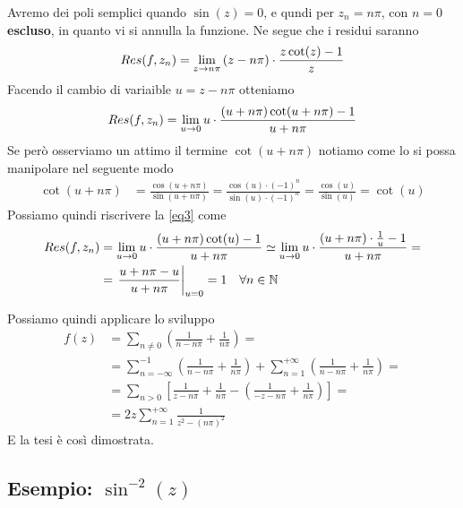 Avremo dei poli semplici quando $\sin(z) = 0$, e qundi per $z_n=n\pi$, con $n=0$ \textbf{escluso}, in quanto vi si annulla la funzione. Ne segue che i residui saranno
\begin{align}
	Res(f,z_n) = \underset{z \rightarrow n\pi}{\lim} \,  (z-n\pi) \cdot \frac{z\cot(z) -1}{z}
\end{align} 
Facendo il cambio di variaible $u=z-n\pi$ otteniamo
\begin{align}
	Res(f,z_n) = \underset{u \rightarrow 0}{\lim} \, u \cdot \frac{(u+n\pi)\cot(u+n\pi) -1}{u+n\pi} \label{eq3}
\end{align} 
Se però osserviamo un attimo il termine $\cot(u+n\pi)$ notiamo come lo si possa manipolare nel seguente modo
\begin{align}
	\cot(u+n\pi) &= \frac{\cos(u+n\pi)}{\sin(u+n\pi)} = \frac{\cos(u)\cdot(-1)^n}{\sin(u)\cdot(-1)^n} = \frac{\cos(u)}{\sin(u)} = \cot(u)
\end{align}
Possiamo quindi riscrivere la \ref{eq3} come
\begin{align}
	Res(f,z_n) &= \underset{u \rightarrow 0}{\lim} \, u \cdot \frac{(u+n\pi)\cot(u) -1}{u+n\pi} \simeq \underset{u \rightarrow 0}{\lim} \, u\cdot \frac{(u+n\pi)\cdot \frac{1}{u} -1}{u+n\pi} = \nonumber\\
	&= \left. \frac{u+n\pi -u}{u+n\pi} \right|_{u=0} = 1 \quad \forall n\in \mathbb{N}
\end{align} 

Possiamo quindi applicare lo sviluppo
\begin{align}
	f(z) &= \sum_{n\neq 0} \left( \frac{1}{n-n\pi} + \frac{1}{n\pi} \right) = \nonumber\\
		 &= \sum_{n=-\infty}^{-1} \left( \frac{1}{n-n\pi} + \frac{1}{n\pi} \right) + \sum_{n=1}^{+\infty} \left( \frac{1}{n-n\pi} + \frac{1}{n\pi} \right) = \nonumber \\
		 &= \sum_{n>0} \left[ \frac{1}{z-n\pi} + \frac{1}{n\pi} - \left( \frac{1}{-z-n\pi} + \frac{1}{n\pi} \right) \right] = \nonumber\\
		 &= 2z\sum_{n=1}^{+\infty} \frac{1}{z^2 - (n\pi)^2}
\end{align}
E la tesi è così dimostrata.

\newpage

\subsection{Esempio: $\sin^{-2}(z)$}

